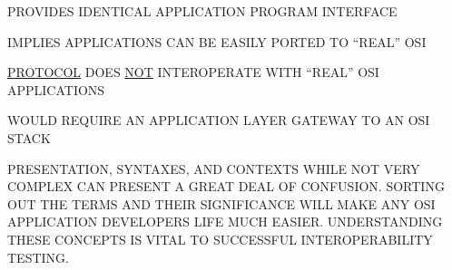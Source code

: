\begin{bwslide}

\begin{nrtc}
\item	PROVIDES IDENTICAL APPLICATION PROGRAM INTERFACE
	\begin{nrtc}
	\item	IMPLIES APPLICATIONS CAN BE EASILY PORTED TO ``REAL'' OSI
	\end{nrtc}
\item	\underline{PROTOCOL} DOES \underline{NOT} INTEROPERATE 
		WITH ``REAL'' OSI APPLICATIONS
	\begin{nrtc}
	\item	WOULD REQUIRE AN APPLICATION LAYER GATEWAY TO AN OSI STACK
	\end{nrtc}
\end{nrtc}
\end{bwslide}


%


\begin{bwslide}

PRESENTATION, SYNTAXES, AND CONTEXTS WHILE NOT VERY COMPLEX CAN PRESENT A GREAT 
DEAL OF CONFUSION.  SORTING OUT THE TERMS AND THEIR SIGNIFICANCE WILL MAKE ANY
OSI APPLICATION DEVELOPERS LIFE MUCH EASIER.  UNDERSTANDING THESE CONCEPTS IS
VITAL TO SUCCESSFUL INTEROPERABILITY TESTING.
\end{bwslide}


%


